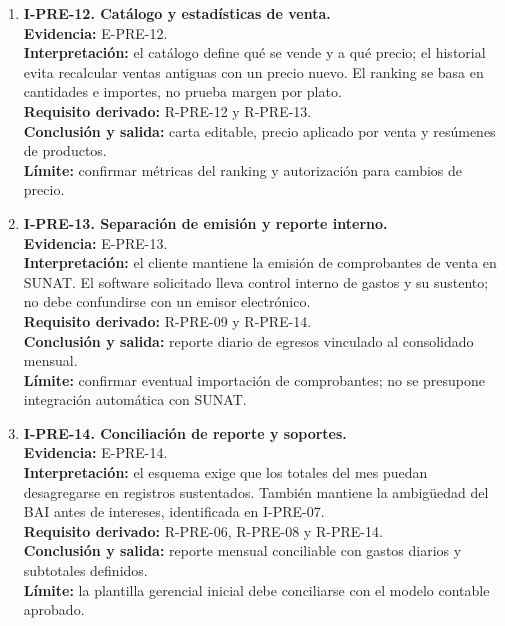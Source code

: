 \begin{enumerate}
  \item \textbf{I-PRE-12. Catálogo y estadísticas de venta.}\\
  \textbf{Evidencia:} E-PRE-12.\\
  \textbf{Interpretación:} el catálogo define qué se vende y a qué precio; el
  historial evita recalcular ventas antiguas con un precio nuevo. El ranking
  se basa en cantidades e importes, no prueba margen por plato.\\
  \textbf{Requisito derivado:} R-PRE-12 y R-PRE-13.\\
  \textbf{Conclusión y salida:} carta editable, precio aplicado por venta y
  resúmenes de productos.\\
  \textbf{Límite:} confirmar métricas del ranking y autorización para
  cambios de precio.

  \item \textbf{I-PRE-13. Separación de emisión y reporte interno.}\\
  \textbf{Evidencia:} E-PRE-13.\\
  \textbf{Interpretación:} el cliente mantiene la emisión de comprobantes de
  venta en SUNAT. El software solicitado lleva control interno de gastos y
  su sustento; no debe confundirse con un emisor electrónico.\\
  \textbf{Requisito derivado:} R-PRE-09 y R-PRE-14.\\
  \textbf{Conclusión y salida:} reporte diario de egresos vinculado al
  consolidado mensual.\\
  \textbf{Límite:} confirmar eventual importación de comprobantes; no se
  presupone integración automática con SUNAT.

  \item \textbf{I-PRE-14. Conciliación de reporte y soportes.}\\
  \textbf{Evidencia:} E-PRE-14.\\
  \textbf{Interpretación:} el esquema exige que los totales del mes puedan
  desagregarse en registros sustentados. También mantiene la ambigüedad del
  BAI antes de intereses, identificada en I-PRE-07.\\
  \textbf{Requisito derivado:} R-PRE-06, R-PRE-08 y R-PRE-14.\\
  \textbf{Conclusión y salida:} reporte mensual conciliable con gastos
  diarios y subtotales definidos.\\
  \textbf{Límite:} la plantilla gerencial inicial debe conciliarse con el
  modelo contable aprobado.
\end{enumerate}

